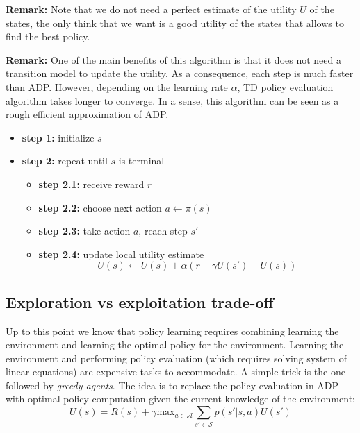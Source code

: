 \textbf{Remark:} Note that we do not need a perfect estimate of the utility $U$
of the states, the only think that we want is a good utility of the states that allows
to find the best policy.
\newline

\textbf{Remark:} One of the main benefits of this algorithm is that it does not
need a transition model to update the utility. As a consequence, each step is
much faster than ADP. However, depending on the learning rate $\alpha$, TD policy
evaluation algorithm takes longer to converge. In a sense, this algorithm can be
seen as a rough efficient approximation of ADP.
\newline

\begin{itemize}
	\item \textbf{step 1:} initialize $s$

	\item \textbf{step 2:} repeat until $s$ is terminal
		\begin{itemize}
			\item \textbf{step 2.1:} receive reward $r$

			\item \textbf{step 2.2:} choose next action $a \leftarrow \pi(s)$

			\item \textbf{step 2.3:} take action $a$, reach step $s'$

			\item \textbf{step 2.4:} update local utility estimate
				\[
					U(s) \leftarrow U(s) + \alpha(r+\gamma U(s') - U(s))
				\]
		\end{itemize}
\end{itemize}

\subsection{Exploration vs exploitation trade-off}
Up to this point we know that policy learning requires combining learning the
environment and learning the optimal policy for the environment. Learning the environment
and performing policy evaluation (which requires solving system of linear
equations) are expensive tasks to accommodate. A simple trick is the one
followed by \textit{greedy agents}. The idea is to replace the policy evaluation
in ADP with optimal policy computation given the current knowledge of the
environment:
\begin{equation}
	U(s) = R(s) + \gamma \text{max}_{a \in \mathcal{A}}\sum_{s' \in \mathcal{S}}p(s
	' |s,a)U(s')
\end{equation}

